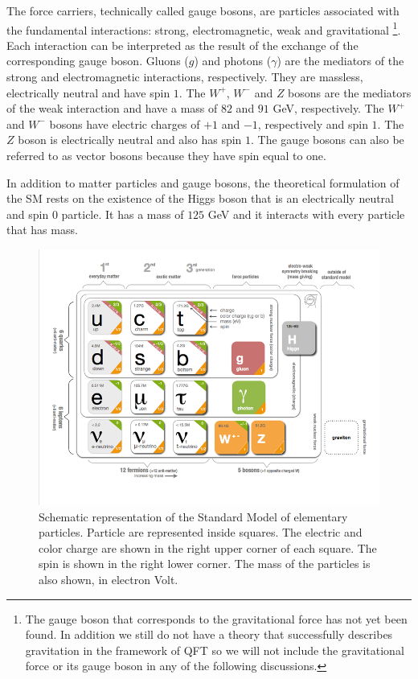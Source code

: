 The force carriers, technically called gauge bosons, are particles associated with the fundamental interactions: strong, electromagnetic, weak and gravitational \footnote{The gauge boson that corresponds to the gravitational force has not yet been found. In addition we still do not have a theory that successfully describes gravitation in the framework of QFT so we will not include the gravitational force or its gauge boson in any of the following discussions.}. Each interaction can be interpreted as the result of the exchange of the corresponding gauge boson. Gluons ($g$) and photons ($\gamma$) are the mediators of the strong and electromagnetic interactions, respectively. They are massless, electrically neutral and have spin $1$. The $W^+$, $W^-$ and $Z$ bosons are the mediators of the weak interaction and have a mass of $82$ and $91$ GeV, respectively. The $W^+$ and $W^-$ bosons have electric charges of $+1$ and $-1$, respectively and spin $1$. The $Z$ boson is electrically neutral and also has spin $1$. The gauge bosons can also be referred to as vector bosons because they have spin equal to one.

In addition to matter particles and gauge bosons, the theoretical formulation of the SM rests on the existence of the Higgs boson that is an electrically neutral and spin $0$ particle. It has a mass of $125$ GeV and it interacts with every particle that has mass.


\begin{figure}[]
	\centering
	\includegraphics[trim={.5cm 1.5cm 0.5cm 0},clip,width=.8\textwidth]{./Figures/SM_CERN.png}
	\caption{Schematic representation of the Standard Model of elementary particles. Particle are represented inside squares. The electric and color charge are shown in the right upper corner of each square. The spin is shown in the right lower corner. The mass of the particles is also shown, in electron Volt.}
	\label{fig:sm_particles}
\end{figure}

